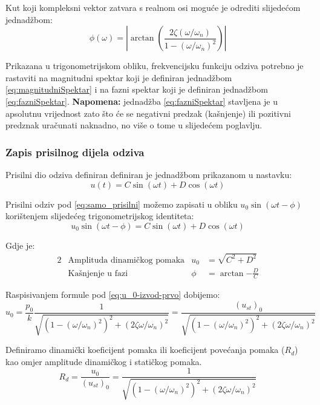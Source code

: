Kut koji kompleksni vektor zatvara s realnom osi moguće je odrediti slijedećom
jednadžbom:
\begin{equation}
        \phi(\omega)=\left|\arctan\left(\frac{2\zeta(\omega/\omega_n)}
                      {1-(\omega/\omega_n)^2}\right)\right|\label{eq:fazniSpektar}
\end{equation}

Prikazana u trigonometrijskom obliku, frekvencijsku funkciju odziva potrebno je
rastaviti na magnitudni spektar koji je definiran jednadžbom \eqref{eq:magnitudniSpektar} i
na fazni spektar koji je definiran jednadžbom \eqref{eq:fazniSpektar}.
\textbf{Napomena:} jednadžba \eqref{eq:fazniSpektar} stavljena je u apsolutnu
vrijednost zato što će se negativni predzak (kašnjenje) ili pozitivni predznak
uračunati naknadno, no više o tome u slijedećem poglavlju.

\subsubsection{Zapis prisilnog dijela odziva}
Prisilni dio odziva definiran definiran je jednadžbom prikazanom u nastavku:
\begin{equation}\label{eq:samo_prisilni}
    u(t)=C\sin(\omega t) + D\cos(\omega t)
\end{equation}

Prisilni odziv pod \eqref{eq:samo_prisilni} možemo zapisati u obliku $u_0\sin(\omega t
- \phi)$ 
korištenjem slijedećeg trigonometrijskog identiteta:
\begin{equation}\label{eq:prisilni_dio_odziva}
    u_0\sin(\omega t - \phi) = C\sin(\omega t) + D\cos(\omega t)
\end{equation}

Gdje je:
\begin{alignat}{2}
    &\text{Amplituda dinamičkog pomaka} & u_0 &= \sqrt{C^2+D^2}\label{eq:u_0-izvod-prvo}\\
    &\text{Kašnjenje u fazi} & \phi &= \arctan{-\frac{D}{C}}\label{eq:fi-izvod}
\end{alignat}

Raspisivanjem formule pod \eqref{eq:u_0-izvod-prvo} dobijemo:
\begin{equation}\label{eq:u_0-izvod-raspisano}
    u_0 = \frac{p_0}{k}\frac{1}{\sqrt{(1-(\omega/\omega_n)^2)^2+(2\zeta\omega/\omega_n)^2}}
        = \frac{(u_{st})_0}{\sqrt{(1-(\omega/\omega_n)^2)^2+(2\zeta\omega/\omega_n)^2}}
\end{equation}

Definiramo dinamički koeficijent pomaka ili koeficijent povećanja pomaka ($R_d$) kao omjer
amplitude dinamičkog i statičkog pomaka.
\begin{equation}\label{eq:R_d-izvod-konacno}
    R_d = \frac{u_0}{(u_{st})_0}=\frac{1}{\sqrt{(1-(\omega/\omega_n)^2)^2+(2\zeta\omega/\omega_n)^2}}
\end{equation}

